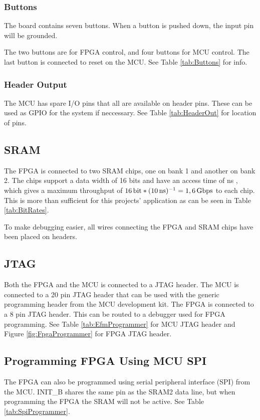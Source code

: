 \subsubsection{Buttons}
The board contains seven buttons.
When a button is pushed down, the input pin will be grounded.

The two buttons are for FPGA control, and four buttons for MCU control.
The last button is connected to reset on the MCU.
See Table \ref{tab:Buttons} for info.

\subsubsection{Header Output}
The MCU has spare I/O pins that all are available on header pins.
These can be used as GPIO for the system if neccessary.
See Table \ref{tab:HeaderOut} for location of pins.

\subsection{SRAM}
\label{subsec:sram}
The FPGA is connected to two SRAM chips, one on bank 1 and another on bank 2.
The chips support a data width of 16 bits and have an access time of \unit[10]{ns} \cite{sramdatasheet}, which gives a maximum throughput of $\unit[16]{bit} * (\unit[10]{ns})^{-1} = \unit[1,6]{Gbps}$ to each chip.
This is more than sufficient for this projects' application as can be seen in Table \ref{tab:BitRates}.

To make debugging easier, all wires connecting the FPGA and SRAM chips have been placed on headers.

\subsection{JTAG}
Both the FPGA and the MCU is connected to a JTAG header.
The MCU is connected to a 20 pin JTAG header that can be used with the generic programming header from the MCU development kit.
The FPGA is connected to a 8 pin JTAG header.
This can be routed to a debugger used for FPGA programming.
See Table \ref{tab:EfmProgrammer} for MCU JTAG header and Figure \ref{fig:FpgaProgrammer} for FPGA JTAG header.

\subsection{Programming FPGA Using MCU SPI}
The FPGA can also be programmed using serial peripheral interface (SPI) from the MCU.
INIT\_B shares the same pin as the SRAM2 data line, but when programming the FPGA the SRAM will not be active.
See Table \ref{tab:SpiProgrammer}.


